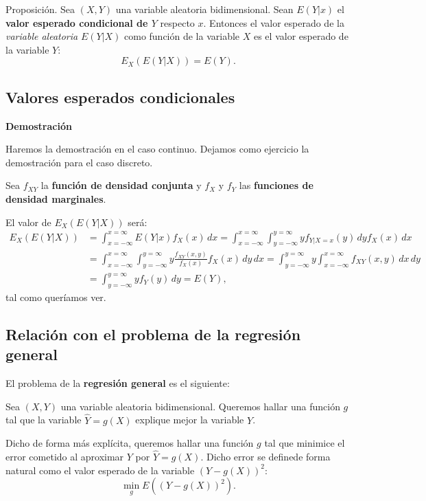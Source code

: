 \documentclass[]{book}
\begin{document}
Proposición.
Sea \((X,Y)\) una variable aleatoria bidimensional. Sean \(E(Y|x)\) el \textbf{valor esperado condicional de \(Y\)} respecto \(x\). Entonces el valor esperado de la \emph{variable aleatoria} \(E(Y|X)\) como función de la variable \(X\) es el valor esperado de la variable \(Y\):
\[
E_X(E(Y|X))=E(Y).
\]

\hypertarget{valores-esperados-condicionales-2}{%
\subsection{Valores esperados condicionales}\label{valores-esperados-condicionales-2}}

\textbf{Demostración}

Haremos la demostración en el caso continuo. Dejamos como ejercicio la demostración para el caso discreto.

Sea \(f_{XY}\) la \textbf{función de densidad conjunta} y \(f_X\) y \(f_Y\) las \textbf{funciones de densidad marginales}.

El valor de \(E_X(E(Y|X))\) será:
\[
\begin{array}{rl}
E_X(E(Y|X)) & =\int_{x=-\infty}^{x=\infty} E(Y|x)f_X(x)\, dx=\int_{x=-\infty}^{x=\infty}\int_{y=-\infty}^{y=\infty} y f_{Y|X=x}(y)\, dy f_X(x)\, dx \\ & = \int_{x=-\infty}^{x=\infty}\int_{y=-\infty}^{y=\infty} y \frac{f_{XY}(x,y)}{f_X(x)}f_X(x)\, dy\, dx = \int_{y=-\infty}^{y=\infty} y \int_{x=-\infty}^{x=\infty}f_{XY}(x,y)\, dx\, dy \\ &  = \int_{y=-\infty}^{y=\infty} y f_Y(y)\, dy = E(Y),
\end{array}
\]
tal como queríamos ver.

\hypertarget{relaciuxf3n-con-el-problema-de-la-regresiuxf3n-general}{%
\subsection{Relación con el problema de la regresión general}\label{relaciuxf3n-con-el-problema-de-la-regresiuxf3n-general}}

El problema de la \textbf{regresión general} es el siguiente:

Sea \((X,Y)\) una variable aleatoria bidimensional. Queremos hallar una función \(g\) tal que la variable \(\hat{Y}=g(X)\) explique mejor la variable \(Y\).

Dicho de forma más explícita, queremos hallar una función \(g\) tal que minimice el error cometido al aproximar \(Y\) por \(\hat{Y}=g(X)\). Dicho error se definede forma natural como el valor esperado de la variable \((Y-g(X))^2\):
\[
\min_g E\left((Y-g(X))^2\right).
\]
\end{document}
